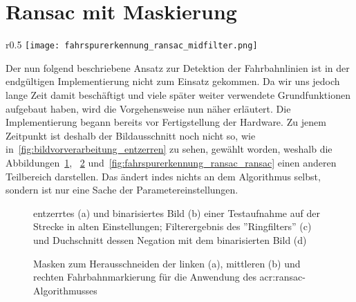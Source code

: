 \section{Ransac mit Maskierung}

\begin{wrapfigure}{r}{0.5\textwidth}
 \centering
  \texttt{[image: fahrspurerkennung\_ransac\_midfilter.png]}
  \caption{Der Kern des ''Ringfilters''}
\label{fig:fahrspurerkennung_ransac_midfilter}
\end{wrapfigure} 

Der nun folgend beschriebene Ansatz zur Detektion der Fahrbahnlinien ist in der endgültigen Implementierung nicht zum Einsatz gekommen. Da wir uns jedoch lange Zeit damit beschäftigt und viele später weiter verwendete Grundfunktionen aufgebaut haben, wird die Vorgehensweise nun näher erläutert.
Die Implementierung begann bereits vor Fertigstellung der Hardware. Zu jenem Zeitpunkt ist deshalb der Bildausschnitt noch nicht so, wie in~\ref{fig:bildvorverarbeitung_entzerren} zu sehen, gewählt worden, weshalb die Abbildungen~\ref{fig:fahrspurerkennung_ransac_binarisieren}, ~\ref{fig:fahrspurerkennung_ransac_masken} und~\ref{fig:fahrspurerkennung_ransac_ransac} einen anderen Teilbereich darstellen. Das ändert indes nichts an dem Algorithmus selbst, sondern ist nur eine Sache der Parametereinstellungen. 


\begin{figure}[H] %
  \centering
  \qquad \quad
  \qquad \quad
  \qquad \quad
  \caption{entzerrtes (a) und binarisiertes Bild (b) einer Testaufnahme auf der Strecke in alten Einstellungen; Filterergebnis des ''Ringfilters'' (c) und Duchschnitt dessen Negation mit dem binarisierten Bild (d)}
\label{fig:fahrspurerkennung_ransac_binarisieren}
\end{figure} 



\begin{figure}[H] %
  \centering
  \quad
  \quad
  \caption{Masken zum Herausschneiden der linken (a), mittleren (b) und rechten Fahrbahnmarkierung für die Anwendung des \gls{acr:ransac}-Algorithmusses}
\label{fig:fahrspurerkennung_ransac_masken}
\end{figure} 

